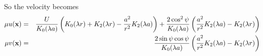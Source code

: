 \documentclass[12pt]{article}
\newcommand{\bx}{\mbox{\bf x}}
\begin{document}
So the velocity becomes
\begin{eqnarray}
\mu u(\bx) &=& \frac{U}{K_0(\lambda a)} \left( K_0(\lambda r) + K_2(\lambda r) - \frac{a^2}{r^2}K_2(\lambda a) \right) 
+  \frac{2\cos^2\psi}{K_0(\lambda a)}\left( \frac{a^2}{r^2} K_2(\lambda a) - K_2(\lambda r) \right) \\
\mu v(\bx) &=&  \frac{2\sin\psi\cos\psi}{K_0(\lambda a)}\left( \frac{a^2}{r^2} K_2(\lambda a) - K_2(\lambda r) \right)
\end{eqnarray}
\end{document}

